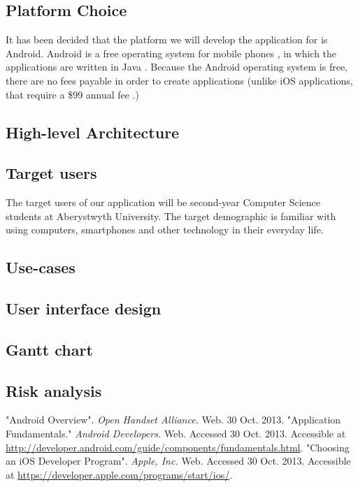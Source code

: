 \documentclass[12pt,a4paper,titlepage,onecolumn,draft]{report}
\begin{document}
\subsection{Platform Choice}
It has been decided that the platform we will develop the application for is
Android. Android is a free operating system for mobile phones \cite{openhandset},
in which the applications are written in Java \cite{androidapi}. Because the
Android operating system is free, there are no fees payable in order to create
applications (unlike iOS applications, that require a \$99 annual
fee \cite{appledev}.)

\subsection{High-level Architecture}

\subsection{Target users}
The target users of our application will be second-year Computer Science
students at Aberystwyth University. The target demographic is familiar with
using computers, smartphones and other technology in their everyday life.
\subsection{Use-cases}

\subsection{User interface design}

\subsection{Gantt chart}

\subsection{Risk analysis}

\begin{thebibliography}{5} %
    "Android Overview". \emph{Open Handset Alliance.} Web. 30 Oct. 2013.
    "Application Fundamentals." \emph{Android Developers.} Web. Accessed 30 Oct.
    2013. Accessible at
    \url{http://developer.android.com/guide/components/fundamentals.html}.
    "Choosing an iOS Developer Program". \emph{Apple, Inc.} Web. Accessed 30
    Oct. 2013. Accessible at
    \url{https://developer.apple.com/programs/start/ios/}.
\end{thebibliography}
\end{document}
